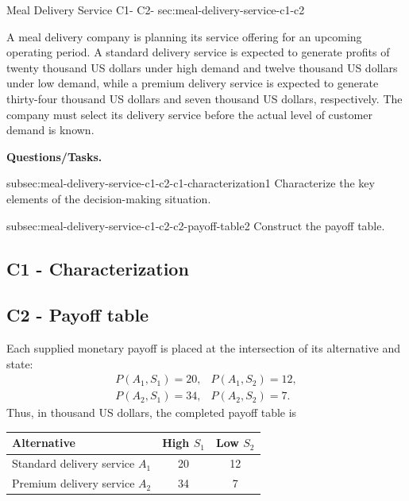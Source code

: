 	\sectionScored
	{Meal Delivery Service}
	{C1- \hspace{2mm} C2-}
	{sec:meal-delivery-service-c1-c2}
	{
		A meal delivery company is planning its service offering for an upcoming operating period. A standard delivery service is expected to generate profits of twenty thousand US dollars under high demand and twelve thousand US dollars under low demand, while a premium delivery service is expected to generate thirty-four thousand US dollars and seven thousand US dollars, respectively. The company must select its delivery service before the actual level of customer demand is known.
		
		\textbf{Questions/Tasks.}
		\begin{enumerate}
			\CriterionTask
			{subsec:meal-delivery-service-c1-c2-c1-characterization}{1}
			{Characterize the key elements of the decision-making situation. }
			
			\CriterionTask
			{subsec:meal-delivery-service-c1-c2-c2-payoff-table}{2}
			{Construct the payoff table. }
		\end{enumerate}
		
		\label{subsec:meal-delivery-service-c1-c2-c1-characterization}
		\subsection*{C1 - Characterization }
		
		
		\label{subsec:meal-delivery-service-c1-c2-c2-payoff-table}
		\subsection*{C2 - Payoff table }
		
		Each supplied monetary payoff is placed at the intersection of its alternative and state:
		\[
		\begin{array}{ll}
			P(A_1,S_1)=20, & P(A_1,S_2)=12,\\
			P(A_2,S_1)=34, & P(A_2,S_2)=7.
		\end{array}
		\]
		Thus, in thousand US dollars, the completed payoff table is
		\begin{center}
			\begin{tabular}{lcc}
				\toprule
				Alternative & High \(S_1\) & Low \(S_2\)\\
				\midrule
				Standard delivery service \(A_1\) & 20 & 12\\
				Premium delivery service \(A_2\) & 34 & 7\\
				\bottomrule
			\end{tabular}
		\end{center}
		
}
